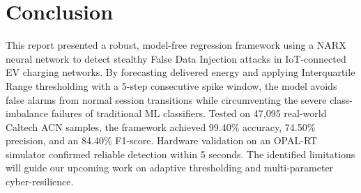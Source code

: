 \documentclass[conference]{IEEEtran}
\begin{document}
\section{Conclusion}
This report presented a robust, model-free regression framework using a NARX neural network to detect stealthy False Data Injection attacks in IoT-connected EV charging networks. By forecasting delivered energy and applying Interquartile Range thresholding with a 5-step consecutive spike window, the model avoids false alarms from normal session transitions while circumventing the severe class-imbalance failures of traditional ML classifiers. Tested on 47,095 real-world Caltech ACN samples, the framework achieved 99.40\% accuracy, 74.50\% precision, and an 84.40\% F1-score. Hardware validation on an OPAL-RT simulator confirmed reliable detection within 5 seconds. The identified limitations will guide our upcoming work on adaptive thresholding and multi-parameter cyber-resilience.



\end{document}
